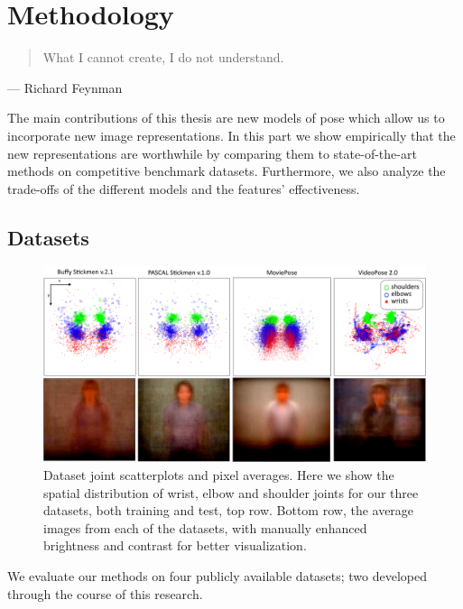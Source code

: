 \chapter{Methodology}
\begin{quote}
What I cannot create, I do not understand.
\end{quote}
\hfill --- Richard Feynman 
\vspace{0.5in}

The main contributions of this thesis are new models of pose which allow us to 
incorporate new image representations.  In this part we show empirically that the new 
representations are worthwhile by comparing them to state-of-the-art methods on 
competitive benchmark datasets.  Furthermore, we also analyze the trade-offs of 
the different models and the features' effectiveness.

\section{Datasets}\label{sec:datasets}
\begin{figure}[tb!]
\begin{center}
\includegraphics[width=1.05\textwidth]{figs/dataset-scatterplots.pdf}
\caption[Dataset joint scatterplots and pixel averages.]{Dataset joint 
scatterplots and pixel averages.  Here we show the spatial distribution of 
wrist, elbow and shoulder joints for our three datasets, both training and 
test, top row.  Bottom row, the average images from each of the datasets, with 
manually enhanced brightness and contrast for better visualization.}
\label{fig:dataset-scatterplots}
\end{center}
\end{figure}



We evaluate our methods on four publicly available datasets; two developed through the course of this research.

